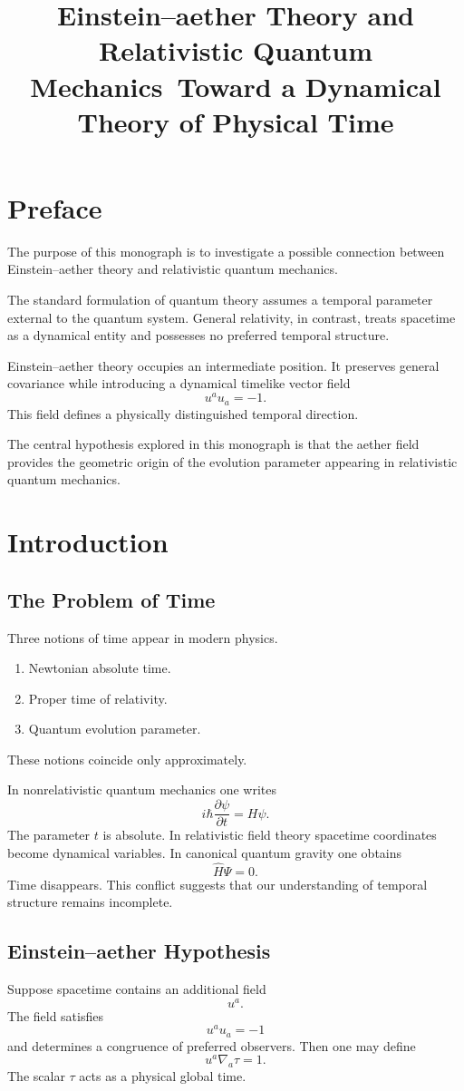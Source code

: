\documentclass[11pt]{book}
\title{
Einstein--aether Theory and Relativistic Quantum Mechanics\
Toward a Dynamical Theory of Physical Time
}
\author{}
\date{}
\begin{document}
\frontmatter
\maketitle
\tableofcontents
\chapter*{Preface}
The purpose of this monograph is to investigate a possible connection
between Einstein--aether theory and relativistic quantum mechanics.

The standard formulation of quantum theory assumes a temporal
parameter external to the quantum system.
General relativity, in contrast, treats spacetime as a dynamical
entity and possesses no preferred temporal structure.

Einstein--aether theory occupies an intermediate position.
It preserves general covariance while introducing a dynamical
timelike vector field
\[
u^a u_a=-1.
\]
This field defines a physically distinguished temporal direction.

The central hypothesis explored in this monograph is that the
aether field provides the geometric origin of the evolution
parameter appearing in relativistic quantum mechanics.

\mainmatter
\chapter{Introduction}
\section{The Problem of Time}
Three notions of time appear in modern physics.
\begin{enumerate}
\item Newtonian absolute time.
\item Proper time of relativity.
\item Quantum evolution parameter.
\end{enumerate}
These notions coincide only approximately.

In nonrelativistic quantum mechanics one writes
\[
i\hbar \frac{\partial \psi}{\partial t} =  H\psi .
\]
The parameter $t$ is absolute.
In relativistic field theory spacetime coordinates become
dynamical variables.
In canonical quantum gravity one obtains
\[
\hat H \Psi =0.
\]
Time disappears.
This conflict suggests that our understanding of temporal
structure remains incomplete.

\section{Einstein--aether Hypothesis}
Suppose spacetime contains an additional field
\[u^a .\]
The field satisfies
\[u^a u_a=-1\]
and determines a congruence of preferred observers.
Then one may define
\[u^a\nabla_a \tau =1.\]
The scalar $\tau$ acts as a physical global time.
\end{document}
